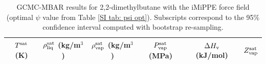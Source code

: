 \documentclass[journal=jctc,manuscript=article]{achemso}
\begin{document}
\begin{table}[htb!]
	\caption{GCMC-MBAR results for 2,2-dimethylbutane with the iMiPPE force field (optimal $\psi$ value from Table \ref{SI tab: psi opt}). Subscripts correspond to the 95\% confidence interval computed with bootstrap re-sampling.}
	\begin{center}
		\begin{tabular}{|c|c|c|c|c|c|}
			\hline
			$T^{\rm sat}$ (K) & $\rho_{\rm liq}^{\rm sat}$ (kg/m$^3$) & $\rho_{\rm vap}^{\rm sat}$ (kg/m$^3$) & $P_{\rm vap}^{\rm sat}$ (MPa) & $\Delta H_{\rm v}$ (kJ/mol) & $Z_{\rm vap}^{\rm sat}$ \\ \hline
			
			\hline
		\end{tabular}
	\end{center}
\end{table}
\end{document}
